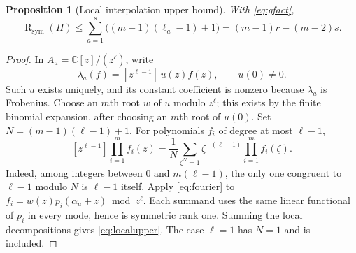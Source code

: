 \documentclass[11pt]{article}
\newtheorem{proposition}[theorem]{Proposition}
\theoremstyle{definition}
\theoremstyle{remark}
\newcommand{\C}{\mathbb C}
\newcommand{\SR}{\operatorname{R}_{\mathrm{sym}}}
\begin{document}
\begin{proposition}[Local interpolation upper bound]\label{prop:localupper}
With \eqref{eq:gfact},
\begin{equation}\label{eq:localupper}
 \SR(H)\le\sum_{a=1}^s\bigl((m-1)(\ell_a-1)+1\bigr)
          =(m-1)r-(m-2)s.
\end{equation}
\end{proposition}
\begin{proof}
In $A_a=\C[z]/(z^\ell)$, write
\[
 \lambda_a(f)=[z^{\ell-1}]\,u(z)f(z),\qquad u(0)\ne0.
\]
Such $u$ exists uniquely, and its constant coefficient is nonzero because
$\lambda_a$ is Frobenius. Choose an $m$th root $w$ of $u$ modulo $z^\ell$;
this exists by the finite binomial expansion, after choosing an $m$th root
of $u(0)$.
Set $N=(m-1)(\ell-1)+1$. For polynomials $f_i$ of degree at most $\ell-1$,
\begin{equation}\label{eq:fourier}
 [z^{\ell-1}]\prod_{i=1}^m f_i(z)
 =\frac1N\sum_{\zeta^N=1}\zeta^{-(\ell-1)}
                    \prod_{i=1}^m f_i(\zeta).
\end{equation}
Indeed, among integers between $0$ and $m(\ell-1)$, the only one congruent
to $\ell-1$ modulo $N$ is $\ell-1$ itself.
Apply \eqref{eq:fourier} to
$f_i=w(z)p_i(\alpha_a+z)\bmod z^\ell$.
Each summand uses the same linear functional of $p_i$ in every mode, hence is
symmetric rank one. Summing the local decompositions gives \eqref{eq:localupper}.
The case $\ell=1$ has $N=1$ and is included.
\end{proof}
\end{document}
